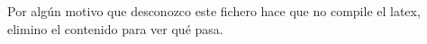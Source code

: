 Por algún motivo que desconozco este fichero hace que no compile el latex, 
elimino el contenido para ver qué pasa. 
